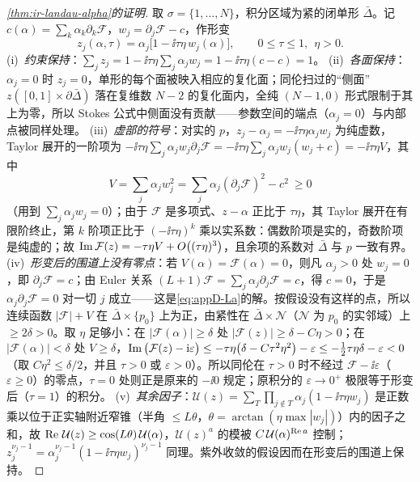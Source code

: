 \begin{proof}[\cref{thm:ir-landau-alpha}的证明]
取 $\sigma=\{1,\dots,N\}$，积分区域为紧的闭单形 $\bar\Delta$。记 $c(\alpha)=\sum_k\alpha_k\partial_k\mathcal F$，$w_j=\partial_j\mathcal F-c$，作形变
\begin{equation}\label{eq:appD-deform}
z_j(\alpha,\tau)=\alpha_j\big[1-\ii\tau\eta\,w_j(\alpha)\big],\qquad 0\le\tau\le1,\ \ \eta>0 .
\end{equation}
(i)~\emph{约束保持}：$\sum_jz_j=1-\ii\tau\eta\sum_j\alpha_jw_j=1-\ii\tau\eta(c-c)=1$。
(ii)~\emph{各面保持}：$\alpha_j=0$ 时 $z_j=0$，单形的每个面被映入相应的复化面；同伦扫过的“侧面” $z([0,1]\times\partial\bar\Delta)$ 落在复维数 $N-2$ 的复化面内，全纯 $(N-1,0)$ 形式限制于其上为零，所以 Stokes 公式中侧面没有贡献——参数空间的端点（$\alpha_j=0$）与内部点被同样处理。
(iii)~\emph{虚部的符号}：对实的 $p$，$z_j-\alpha_j=-\ii\tau\eta\alpha_jw_j$ 为纯虚数，Taylor 展开的一阶项为 $-\ii\tau\eta\sum_j\alpha_jw_j\partial_j\mathcal F=-\ii\tau\eta\sum_j\alpha_jw_j(w_j+c)=-\ii\tau\eta V$，其中
\[
V=\sum_j\alpha_jw_j^2=\sum_j\alpha_j(\partial_j\mathcal F)^2-c^2\ \ge0
\]
（用到 $\sum_j\alpha_jw_j=0$）；由于 $\mathcal F$ 是多项式、$z-\alpha$ 正比于 $\tau\eta$，其 Taylor 展开在有限阶终止，第 $k$ 阶项正比于 $(-\ii\tau\eta)^k$ 乘以实系数：偶数阶项是实的，奇数阶项是纯虚的；故 $\operatorname{Im}\mathcal F(z)=-\tau\eta V+O\big((\tau\eta)^3\big)$，且余项的系数对 $\bar\Delta$ 与 $p$ 一致有界。
(iv)~\emph{形变后的围道上没有零点}：若 $V(\alpha)=\mathcal F(\alpha)=0$，则凡 $\alpha_j>0$ 处 $w_j=0$，即 $\partial_j\mathcal F=c$；由 Euler 关系 $(L+1)\mathcal F=\sum_j\alpha_j\partial_j\mathcal F=c$，得 $c=0$，于是 $\alpha_j\partial_j\mathcal F=0$ 对一切 $j$ 成立——这是\cref{eq:appD-La}的解。按假设没有这样的点，所以连续函数 $|\mathcal F|+V$ 在 $\bar\Delta\times\{p_0\}$ 上为正，由紧性在 $\bar\Delta\times\mathcal N$（$\mathcal N$ 为 $p_0$ 的实邻域）上 $\ge2\delta>0$。取 $\eta$ 足够小：在 $|\mathcal F(\alpha)|\ge\delta$ 处 $|\mathcal F(z)|\ge\delta-C\eta>0$；在 $|\mathcal F(\alpha)|<\delta$ 处 $V\ge\delta$，$\operatorname{Im}\big(\mathcal F(z)-\mathrm{i}\varepsilon\big)\le-\tau\eta\big(\delta-C\tau^2\eta^2\big)-\varepsilon\le-\frac12\tau\eta\delta-\varepsilon<0$（取 $C\eta^2\le\delta/2$，并且 $\tau>0$ 或 $\varepsilon>0$）。所以同伦在 $\tau>0$ 时不经过 $\mathcal F-\ii\varepsilon$（$\varepsilon\ge0$）的零点，$\tau=0$ 处则正是原来的 $-\ii0$ 规定；原积分的 $\varepsilon\to0^+$ 极限等于形变后（$\tau=1$）的积分。
(v)~\emph{其余因子}：$\mathcal U(z)=\sum_{T}\prod_{j\notin T}\alpha_j(1-\ii\tau\eta w_j)$ 是正数乘以位于正实轴附近窄锥（半角 $\le L\theta$，$\theta=\arctan(\eta\max|w_j|)$）内的因子之和，故 $\operatorname{Re}\,\mathcal U(z)\ge\cos(L\theta)\,\mathcal U(\alpha)$，$\mathcal U(z)^a$ 的模被 $C\,\mathcal U(\alpha)^{\operatorname{Re} a}$ 控制；$z_j^{\nu_j-1}=\alpha_j^{\nu_j-1}(1-\ii\tau\eta w_j)^{\nu_j-1}$ 同理。紫外收敛的假设因而在形变后的围道上保持。

\end{proof}

